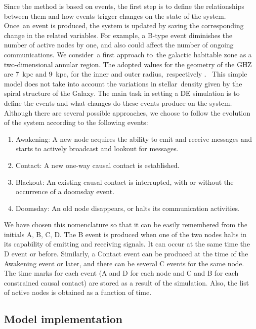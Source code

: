 \documentclass[crop]{CSLB}
\newcommand{\ceti}{node}
\newcommand{\cetis}{nodes}
\newcommand{\blackout}{B event }
\newcommand{\doomsday}{D event }
\newcommand{\aawakening}{Awakening event }
\newcommand{\ccontact}{Contact event }
\newcommand{\contacts}{C events }
\begin{document}
Since the method is based on events, the first step is to define the
relationships between them and how events trigger changes on the state of the
system.
%
Once an event is produced, the system is updated by saving the corresponding
change in the related variables.
%
For example, a B-type event diminishes the number of active \cetis{} by one,
and also could affect the number of ongoing communications.
%
We consider a first approach to the galactic habitable zone as a two-dimensional
annular region.
%
The adopted values for the geometry of the GHZ are 7~kpc and 9~kpc, for the
inner and outer radius, respectively \citep{lineweaver_galactic_2004}. 
%
This simple model does not take into account the variations in stellar density
given by the spiral structure of the Galaxy.
%
The main task in setting a DE simulation is to define the events and what
changes do these events produce on the system.
%
Although there are several possible approaches, we choose to follow the
evolution of the system according to the following events:

\begin{enumerate}
   \item[(A)] Awakening: A new \ceti{} acquires the ability to emit
      and receive messages and starts to actively broadcast and
      lookout for messages.
   \item[(C)] Contact: A new one-way causal contact is established.
   \item[(B)] Blackout: An existing causal contact is interrupted,
      with or without the occurrence of a doomsday event.
   \item[(D)] Doomsday: An old \ceti{} disappears, or halts its
      communication activities.
\end{enumerate}

We have chosen this nomenclature so that it can be easily remembered
from the initials A, B, C, D.
%
The \blackout is produced when one of the two \cetis{} halts in its
capability of emitting and receiving signals.
%
It can occur at the same time the \doomsday or before.
%
Similarly, a \ccontact can be produced at the time of the \aawakening
or later, and there can be several \contacts for the same node.
%
The time marks for each event (A and D for each \ceti{} and C and B
for each constrained causal contact) are stored as a result of the simulation.
%
Also, the list of active \cetis{} is obtained as a function of time.




\subsection{Model implementation}
\end{document}

